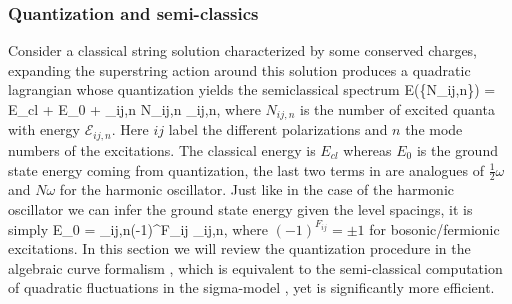 \subsubsection{Quantization and semi-classics}

Consider a classical string solution characterized by some conserved charges, expanding the superstring action around this solution produces a quadratic lagrangian whose quantization yields the semiclassical spectrum
\beq
	\label{eq:quant_energy_full}
	E(\{N_{ij,n}\}) = E_{cl} + E_0 + \sum_{ij,n} N_{ij,n} _{ij,n},
\eeq
where $N_{ij,n}$ is the number of excited quanta with energy $\mathcal{E}_{ij,n}$. Here $ij$ label the different polarizations and $n$ the mode numbers of the excitations. The classical energy is $E_{cl}$ whereas $E_0$ is the ground state energy coming from quantization, the last two terms in  are analogues of $\frac{1}{2} \omega$ and $N \omega$ for the harmonic oscillator. Just like in the case of the harmonic oscillator we can infer the ground state energy given the level spacings, it is simply
\beq
	E_0 =  \sum_{ij,n}(-1)^{F_{ij}} _{ij,n},
\eeq
where $(-1)^{F_{ij}} = \pm 1$ for bosonic/fermionic excitations. In this section we will review the quantization procedure in the algebraic curve formalism \cite{Gromov:2008ec}, which is equivalent to the semi-classical computation of quadratic fluctuations in the sigma-model \cite{Frolov:2002av,Frolov:2003tu,Park:2005ji}, yet is significantly more efficient.

